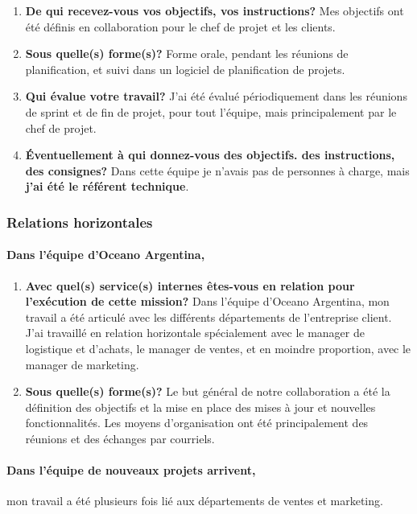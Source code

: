 \documentclass{resume} %
\begin{document}
		\begin{enumerate}
		\item \textbf{De qui recevez-vous vos objectifs, vos instructions?}
			Mes objectifs ont été définis en collaboration pour le chef de projet et les clients.
		\item \textbf{Sous quelle(s) forme(s)?}
			Forme orale, pendant les réunions de planification, et suivi dans un logiciel de planification de projets.
		\item \textbf{Qui évalue votre travail?}
			J'ai été évalué périodiquement dans les réunions de sprint et de fin de projet, pour tout l'équipe, mais principalement par le chef de projet. 
		\item  \textbf{Éventuellement à qui donnez-vous des objectifs. des instructions, des consignes?}
			Dans cette équipe je n'avais pas de  personnes \`a charge, mais \textbf{j'ai été le référent technique}.
		\end{enumerate}
		
					
	\subsubsection{Relations horizontales}
	
	
		\paragraph{Dans l'équipe d'Oceano Argentina,}
		
		\begin{enumerate}
		\item \textbf{Avec quel(s) service(s) internes êtes-vous en relation pour l'exécution de cette mission?}
			Dans l'équipe d'Oceano Argentina, mon travail a été articulé  avec  les différents départements de l'entreprise client. 
			J'ai travaillé en relation horizontale spécialement avec le manager de logistique et d'achats, le manager de ventes, et en moindre proportion, avec le manager de marketing. 

		\item \textbf{Sous quelle(s) forme(s)?}
			Le but général de notre collaboration a été la définition des objectifs et la mise en place des mises \`a jour et nouvelles fonctionnalités. 
		Les moyens d'organisation ont été principalement des réunions et des échanges par courriels. 
		\end {enumerate}	
		
		\paragraph{Dans l'équipe de nouveaux projets arrivent,} mon travail a été plusieurs fois lié aux départements de ventes et marketing. 
		
\end{document}
